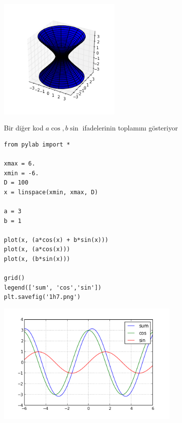 \documentclass[12pt,fleqn]{article}\usepackage{../../common}
\begin{document}
\includegraphics[height=6cm]{hyperboloid.png}

Bir diğer kod $a \cos,b \sin$ ifadelerinin toplamını gösteriyor

\begin{verbatim}
from pylab import *

xmax = 6.
xmin = -6.
D = 100
x = linspace(xmin, xmax, D)

a = 3
b = 1

plot(x, (a*cos(x) + b*sin(x)))
plot(x, (a*cos(x)))
plot(x, (b*sin(x)))

grid()
legend(['sum', 'cos','sin'])
plt.savefig('1h7.png')
\end{verbatim}

\includegraphics[height=6cm]{1h7.png}
\end{document}

